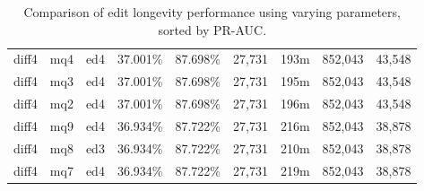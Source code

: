 \begin{sidewaystable}[!ph]
\begin{center}
\begin{tabular}{|c|c|c||c|c||c|c|c|c|}
diff4 & mq4 & ed4 & 37.001\% & 87.698\% & 27,731 & 193m & 852,043 & 43,548 \\
diff4 & mq3 & ed4 & 37.001\% & 87.698\% & 27,731 & 195m & 852,043 & 43,548 \\
diff4 & mq2 & ed4 & 37.001\% & 87.698\% & 27,731 & 196m & 852,043 & 43,548 \\
diff4 & mq9 & ed4 & 36.934\% & 87.722\% & 27,731 & 216m & 852,043 & 38,878 \\
diff4 & mq8 & ed3 & 36.934\% & 87.722\% & 27,731 & 210m & 852,043 & 38,878 \\
diff4 & mq7 & ed4 & 36.934\% & 87.722\% & 27,731 & 219m & 852,043 & 38,878 \\
\hline
\end{tabular}
\end{center}
\caption{Comparison of edit longevity performance using
    varying parameters, sorted by PR-AUC.}
\label{tab:editshoutH}
\end{sidewaystable}
\clearpage
